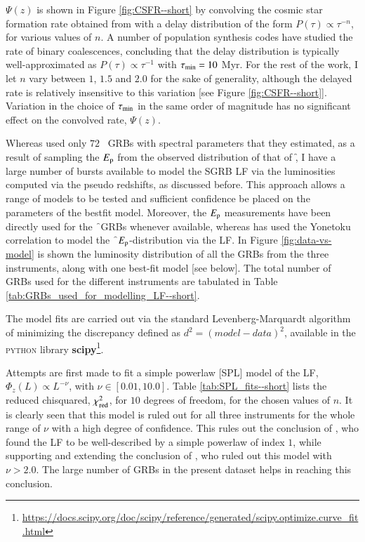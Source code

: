 $\Psi(z)$ is shown in Figure \ref{fig:CSFR--short} by convolving the cosmic star formation rate obtained from  with a delay distribution of the form $ P(\tau) \propto \tau^{-n}$, for various values of $n$. A number of population synthesis codes \citep{Schneider_et_al.-2001-MNRAS, Belczynski_et_al.-2006-ApJ, O'Shaughnessy_et_al.-2008-ApJ} have studied the rate of binary coalescences, concluding that the delay distribution is typically well-approximated as $P(\tau) \propto \tau^{-1}$ with $\tau_{\rm{min}} = 10$ Myr. For the rest of the work, I let $n$ vary between $1$, $1.5$ and $2.0$ for the sake of generality, although the delayed rate is relatively insensitive to this variation [see Figure \ref{fig:CSFR--short}]. Variation in the choice of $\tau_{\rm{min}}$ in the same order of magnitude has no significant effect on the convolved rate, $\Psi(z)$.

Whereas  used only $72$ \B\ GRBs with spectral parameters that they estimated, as a result of sampling the $E_{\rm p}$ from the observed distribution of that of \f, I have a large number of bursts available to model the SGRB LF via the luminosities computed via the pseudo redshifts, as discussed before. This approach allows a range of models to be tested and sufficient confidence be placed on the parameters of the bestfit model. Moreover, the $E_{\rm p}$ measurements have been directly used for the \f\ GRBs whenever available, whereas  has used the Yonetoku correlation to model the \f\ $E_{\rm p}$-distribution via the LF. In Figure \ref{fig:data-vs-model} is shown the luminosity distribution of all the GRBs from the three instruments, along with one best-fit model [see below]. The total number of GRBs used for the different instruments are tabulated in Table \ref{tab:GRBs_used_for_modelling_LF--short}.

The model fits are carried out via the standard Levenberg-Marquardt algorithm of minimizing the discrepancy defined as $d^2 = (model - data)^{2}$, available in the \textsc{python} library \textbf{scipy}\footnote{\url{https://docs.scipy.org/doc/scipy/reference/generated/scipy.optimize.curve_fit.html}}.

Attempts are first made to fit a simple powerlaw [SPL] model of the LF, $\Phi_z(L) \propto L^{-\nu}$, with $\nu \in [0.01,10.0]$. Table \ref{tab:SPL_fits--short} lists the reduced chisquared, $\chi_{{\rm red}}^{2}$, for $10$ degrees of freedom, for the chosen values of $n$. It is clearly seen that this model is ruled out for all three instruments for the whole range of $\nu$ with a high degree of confidence. This rules out the conclusion of , who found the LF to be well-described by a simple powerlaw of index $1$, while supporting and extending the conclusion of , who ruled out this model with $ \nu > 2.0. $ The large number of GRBs in the present dataset helps in reaching this conclusion.


